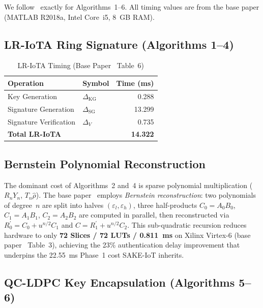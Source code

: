 \documentclass[conference]{IEEEtran}
\begin{document}
We follow~\cite{kumari2022} exactly for Algorithms~1--6. All timing
values are from the base paper (MATLAB R2018a, Intel Core~i5, 8~GB
RAM).

\subsection{LR-IoTA Ring Signature (Algorithms 1--4)}

\begin{table}[!t]
\centering
\caption{LR-IoTA Timing (Base Paper~\cite{kumari2022} Table~6)}
\label{tab:lriota}
\begin{tabular}{llr}
\toprule
\textbf{Operation} & \textbf{Symbol} & \textbf{Time (ms)} \\
\midrule
Key Generation & $\Delta_{\mathrm{KG}}$ & 0.288 \\
Signature Generation & $\Delta_{\mathrm{SG}}$ & 13.299 \\
Signature Verification & $\Delta_V$ & 0.735 \\
\midrule
\textbf{Total LR-IoTA} & & \textbf{14.322} \\
\bottomrule
\end{tabular}
\end{table}

\subsection{Bernstein Polynomial Reconstruction}

The dominant cost of Algorithms~2 and~4 is sparse polynomial multiplication
($R_nY_n$, $T_n\hat{\rho}$). The base paper~\cite{kumari2022} employs
\emph{Bernstein reconstruction}: two polynomials of degree~$n$ are split into
halves $(\varepsilon_l, \varepsilon_h)$, three half-products
$C_0{=}A_0B_0$, $C_1{=}A_1B_1$, $C_2{=}A_2B_2$ are computed in parallel,
then reconstructed via $R^{\prime}_0 = C_0 + u^{n/2}C_1$ and
$C = R^{\prime}_1 + u^{n/2}C_2$. This sub-quadratic recursion reduces
hardware to only \textbf{72 Slices / 72 LUTs / 0.811~ms} on Xilinx Virtex-6
(base paper~\cite{kumari2022} Table~3), achieving the 23\% authentication
delay improvement that underpins the 22.55~ms Phase~1 cost SAKE-IoT inherits.

\subsection{QC-LDPC Key Encapsulation (Algorithms 5--6)}
\end{document}
